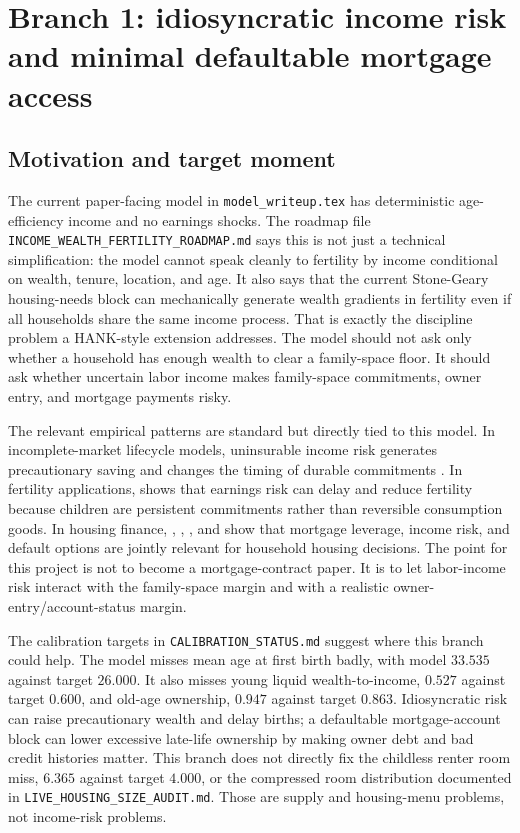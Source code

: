 \documentclass[11pt]{article}
\begin{document}
\section{Branch 1: idiosyncratic income risk and minimal defaultable mortgage access}

\subsection{Motivation and target moment}

The current paper-facing model in \texttt{model\_writeup.tex} has deterministic age-efficiency income and no earnings shocks. The roadmap file \texttt{INCOME\_WEALTH\_FERTILITY\_ROADMAP.md} says this is not just a technical simplification: the model cannot speak cleanly to fertility by income conditional on wealth, tenure, location, and age. It also says that the current Stone-Geary housing-needs block can mechanically generate wealth gradients in fertility even if all households share the same income process. That is exactly the discipline problem a HANK-style extension addresses. The model should not ask only whether a household has enough wealth to clear a family-space floor. It should ask whether uncertain labor income makes family-space commitments, owner entry, and mortgage payments risky.

The relevant empirical patterns are standard but directly tied to this model. In incomplete-market lifecycle models, uninsurable income risk generates precautionary saving and changes the timing of durable commitments \citep{huggett1993,aiyagari1994,krusellSmith1998,kaplanViolanteWeidner2014,kaplanMollViolante2018}. In fertility applications, \citet{sommer2016} shows that earnings risk can delay and reduce fertility because children are persistent commitments rather than reversible consumption goods. In housing finance, \citet{campbellCocco2015}, \citet{corbaeQuintin2015}, \citet{favilukisLudvigsonVanNieuwerburgh2017}, and \citet{kaplanMitmanViolante2020} show that mortgage leverage, income risk, and default options are jointly relevant for household housing decisions. The point for this project is not to become a mortgage-contract paper. It is to let labor-income risk interact with the family-space margin and with a realistic owner-entry/account-status margin.

The calibration targets in \texttt{CALIBRATION\_STATUS.md} suggest where this branch could help. The model misses mean age at first birth badly, with model $33.535$ against target $26.000$. It also misses young liquid wealth-to-income, $0.527$ against target $0.600$, and old-age ownership, $0.947$ against target $0.863$. Idiosyncratic risk can raise precautionary wealth and delay births; a defaultable mortgage-account block can lower excessive late-life ownership by making owner debt and bad credit histories matter. This branch does not directly fix the childless renter room miss, $6.365$ against target $4.000$, or the compressed room distribution documented in \texttt{LIVE\_HOUSING\_SIZE\_AUDIT.md}. Those are supply and housing-menu problems, not income-risk problems.
\end{document}
